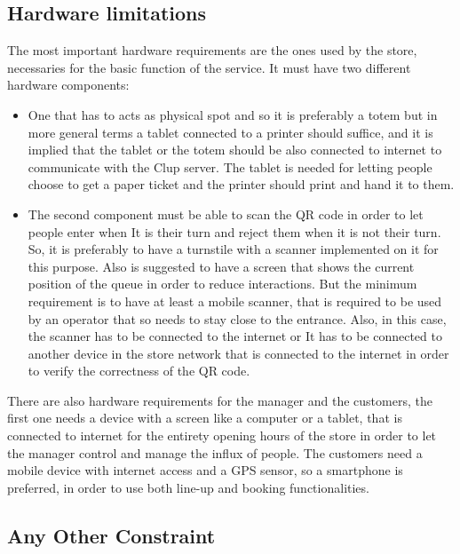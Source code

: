 \subsection{Hardware limitations}

The most important hardware requirements are the ones used by the store, necessaries for the basic function of the service. It must have two different hardware components:
\begin{itemize}
	\item One that has to acts as physical spot and so it is preferably a totem but in more general terms a tablet connected to a printer should suffice, and it is 			implied that the tablet or the totem should be also connected to internet to communicate with the Clup server. The tablet is needed for letting people choose               to get a paper ticket and the printer should print and hand it to them.

	\item The second component must be able to scan the QR code in order to let people enter when It is their turn and reject them when it is not their turn. 			So, it is preferably to have a turnstile with a scanner implemented on it for this purpose. Also is suggested to have a screen that shows the current position 			of the queue in order to reduce interactions.
	But the minimum requirement is to have at least a mobile scanner, that is  required to be used by an operator that so needs to stay close to the entrance. 			Also, in this case, the scanner has to be connected to the internet or It has to be connected to another device in the store network that is connected to the 			internet in order to verify the correctness of the QR code. 

\end{itemize}

There are also hardware requirements for the manager and the customers, the first one needs a device with a screen like a computer or a tablet, that is connected to internet for the entirety opening hours of the store in order to let the manager control and manage the influx of people. The customers need a mobile device with internet access and a GPS sensor, so a smartphone is preferred, in order to use both line-up and booking functionalities. 

\subsection{Any Other Constraint}

